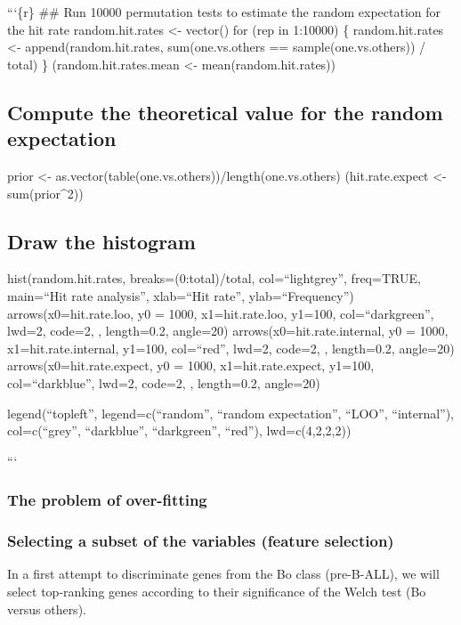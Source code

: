 ```\{r\} \#\# Run 10000 permutation tests to estimate the random
expectation for the hit rate random.hit.rates \textless{}- vector() for
(rep in 1:10000) \{ random.hit.rates \textless{}-
append(random.hit.rates, sum(one.vs.others == sample(one.vs.others)) /
total) \} (random.hit.rates.mean \textless{}- mean(random.hit.rates))

\subsection{Compute the theoretical value for the random
expectation}\label{compute-the-theoretical-value-for-the-random-expectation}

prior \textless{}- as.vector(table(one.vs.others))/length(one.vs.others)
(hit.rate.expect \textless{}- sum(prior\^{}2))

\subsection{Draw the histogram}\label{draw-the-histogram}

hist(random.hit.rates, breaks=(0:total)/total, col=``lightgrey'',
freq=TRUE, main=``Hit rate analysis'', xlab=``Hit rate'',
ylab=``Frequency'') arrows(x0=hit.rate.loo, y0 = 1000, x1=hit.rate.loo,
y1=100, col=``darkgreen'', lwd=2, code=2, , length=0.2, angle=20)
arrows(x0=hit.rate.internal, y0 = 1000, x1=hit.rate.internal, y1=100,
col=``red'', lwd=2, code=2, , length=0.2, angle=20)
arrows(x0=hit.rate.expect, y0 = 1000, x1=hit.rate.expect, y1=100,
col=``darkblue'', lwd=2, code=2, , length=0.2, angle=20)

legend(``topleft'', legend=c(``random'', ``random expectation'',
``LOO'', ``internal''), col=c(``grey'', ``darkblue'', ``darkgreen'',
``red''), lwd=c(4,2,2,2))

```

\subsubsection{The problem of
over-fitting}\label{the-problem-of-over-fitting}

\subsubsection{Selecting a subset of the variables (feature
selection)}\label{selecting-a-subset-of-the-variables-feature-selection}

In a first attempt to discriminate genes from the Bo class (pre-B-ALL),
we will select top-ranking genes according to their significance of the
Welch test (Bo versus others).

